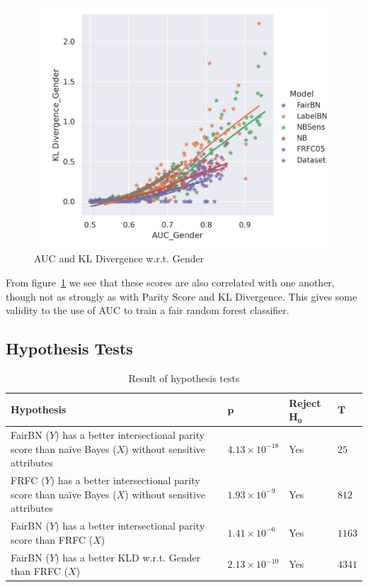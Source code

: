 \begin{figure}
    \centering
    \includegraphics[width=\linewidth]{figures/aucvskldiv-synthethic.png}
    \caption{AUC and KL Divergence w.r.t. Gender}
    \label{fig:aucvskld}
\end{figure}

From figure~\ref{fig:aucvskld} we see that these scores are also correlated with one another, though not as strongly as with Parity Score and KL Divergence. This gives some validity to the use of AUC to train a fair random forest classifier.

\subsection{Hypothesis Tests}

\begin{table}
    \centering
	\begin{tabular}{p{8cm}lll}
        \hline
        \textbf{Hypothesis} & $\boldsymbol{p}$ & Reject $\boldsymbol{H_0}$ & $\boldsymbol{T}$ \\
        \hline
 	    \hline
        FairBN ($Y$) has a better intersectional parity score than naïve Bayes ($X$) without sensitive attributes & $4.13 \times 10^{-18}$ & Yes & $25$ \\ \hline
        FRFC ($Y$) has a better intersectional parity score than naïve Bayes ($X$) without sensitive attributes & $1.93 \times 10^{-9}$ & Yes & $812$ \\ \hline
        FairBN ($Y$) has a better intersectional parity score than FRFC ($X$) & $1.41 \times 10^{-6}$ & Yes & $1163$ \\ \hline
        FairBN ($Y$) has a better KLD w.r.t. Gender than FRFC ($X$) & $2.13 \times 10^{-10}$ & Yes & $4341$ \\ \hline
    \end{tabular}
    \caption{Result of hypothesis tests}
    \label{tab:hypothesisres}
\end{table}

